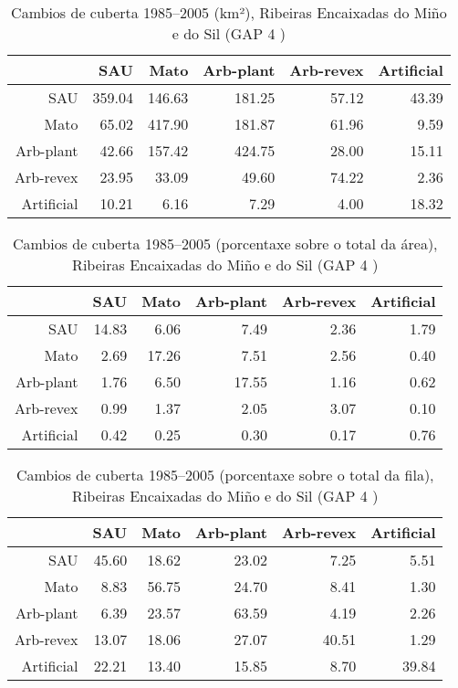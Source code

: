 \clearpage
\begin{table}[p]
\centering
\caption{Cambios de cuberta 1985--2005 (km²), Ribeiras Encaixadas do Miño e do Sil (GAP 4 )} 
\label{TaboaContinxGAP4}
\begin{tabular}{rrrrrr}
  \hline
 & SAU & Mato & Arb-plant & Arb-revex & Artificial \\ 
  \hline
SAU & 359.04 & 146.63 & 181.25 & 57.12 & 43.39 \\ 
  Mato & 65.02 & 417.90 & 181.87 & 61.96 & 9.59 \\ 
  Arb-plant & 42.66 & 157.42 & 424.75 & 28.00 & 15.11 \\ 
  Arb-revex & 23.95 & 33.09 & 49.60 & 74.22 & 2.36 \\ 
  Artificial & 10.21 & 6.16 & 7.29 & 4.00 & 18.32 \\ 
   \hline
\end{tabular}
\end{table}
\begin{table}[p]
\centering
\caption{Cambios de cuberta 1985--2005 (porcentaxe sobre o total da área), Ribeiras Encaixadas do Miño e do Sil (GAP 4 )} 
\label{TaboaContinxPTGAP4}
\begin{tabular}{rrrrrr}
  \hline
 & SAU & Mato & Arb-plant & Arb-revex & Artificial \\ 
  \hline
SAU & 14.83 & 6.06 & 7.49 & 2.36 & 1.79 \\ 
  Mato & 2.69 & 17.26 & 7.51 & 2.56 & 0.40 \\ 
  Arb-plant & 1.76 & 6.50 & 17.55 & 1.16 & 0.62 \\ 
  Arb-revex & 0.99 & 1.37 & 2.05 & 3.07 & 0.10 \\ 
  Artificial & 0.42 & 0.25 & 0.30 & 0.17 & 0.76 \\ 
   \hline
\end{tabular}
\end{table}
\begin{table}[p]
\centering
\caption{Cambios de cuberta 1985--2005 (porcentaxe sobre o total da fila), Ribeiras Encaixadas do Miño e do Sil (GAP 4 )} 
\label{TaboaContinxPFGAP4}
\begin{tabular}{rrrrrr}
  \hline
 & SAU & Mato & Arb-plant & Arb-revex & Artificial \\ 
  \hline
SAU & 45.60 & 18.62 & 23.02 & 7.25 & 5.51 \\ 
  Mato & 8.83 & 56.75 & 24.70 & 8.41 & 1.30 \\ 
  Arb-plant & 6.39 & 23.57 & 63.59 & 4.19 & 2.26 \\ 
  Arb-revex & 13.07 & 18.06 & 27.07 & 40.51 & 1.29 \\ 
  Artificial & 22.21 & 13.40 & 15.85 & 8.70 & 39.84 \\ 
   \hline
\end{tabular}
\end{table}
